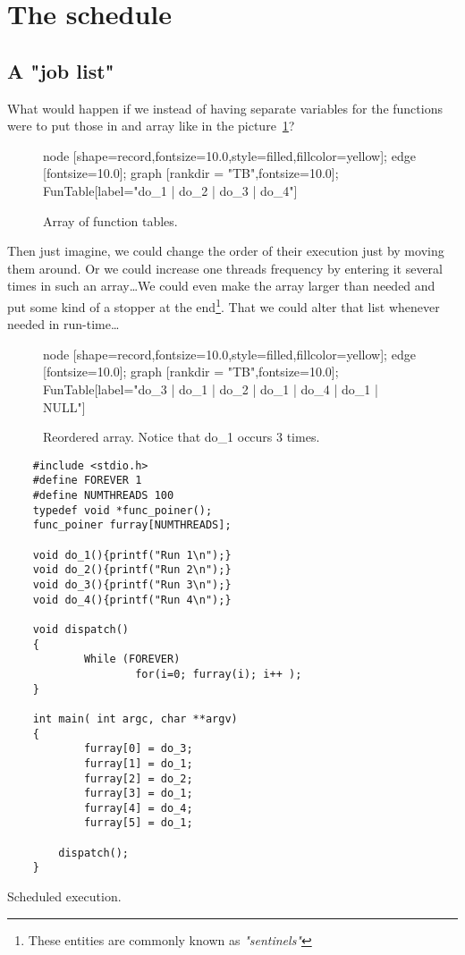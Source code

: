 \section{The schedule}
\subsection{A "job list"}
	What would happen if we instead of having separate variables for the functions were to put those in and array like in the picture~\ref{FunTable}?
	\begin{figure}[!hbp]
	\begin{dotpic}
		node [shape=record,fontsize=10.0,style=filled,fillcolor=yellow];
		edge [fontsize=10.0];
		graph [rankdir = "TB",fontsize=10.0];
		FunTable[label="do_1 | do_2 | do_3 | do_4"]

	\end{dotpic}
	\caption{Array of function tables.\label{FunTable}}	
	\end{figure}
	Then just imagine, we could change the order of their execution just by moving them around. Or we could increase one threads frequency by entering it several times in such an array\ldots We could even make the array larger than needed and put some kind of a stopper at the end\footnote{These entities are commonly known as \textit{"sentinels"}}. That we could alter that list whenever needed in run-time\ldots
	\begin{figure}[!hbp]
	\begin{dotpic}
		node [shape=record,fontsize=10.0,style=filled,fillcolor=yellow];
		edge [fontsize=10.0];
		graph [rankdir = "TB",fontsize=10.0];
		FunTable[label="do_3 | do_1 | do_2 | do_1 | do_4 | do_1 | \<NULL\>"]
	\end{dotpic}
	\caption{Reordered array. Notice that do\_1 occurs 3 times.\label{FunTable2}}	
	\end{figure}

	\begin{table}[!hbp]
	\begin{verbatim}
	#include <stdio.h>
	#define FOREVER 1
	#define NUMTHREADS 100
	typedef void *func_poiner();
	func_poiner furray[NUMTHREADS];

	void do_1(){printf("Run 1\n");}
	void do_2(){printf("Run 2\n");}
	void do_3(){printf("Run 3\n");}
	void do_4(){printf("Run 4\n");}

	void dispatch()
	{
	        While (FOREVER)
	                for(i=0; furray(i); i++ );
	}

	int main( int argc, char **argv)
	{
	        furray[0] = do_3;
	        furray[1] = do_1;
	        furray[2] = do_2;
	        furray[3] = do_1;
	        furray[4] = do_4;
	        furray[5] = do_1;

		dispatch();
	}
	\end{verbatim}
	\caption{Scheduled execution.\label{schedued1}}
	\end{table}
	
